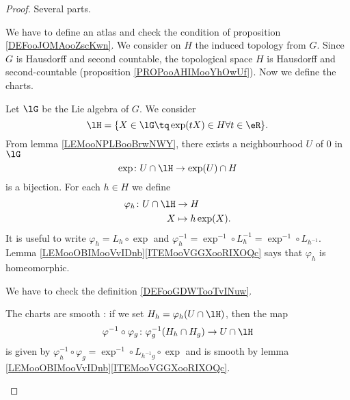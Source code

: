 \begin{proof}
	Several parts.
	\begin{subproof}

		We have to define an atlas and check the condition of proposition \ref{DEFooJOMAooZscKwn}. We consider on \( H\) the induced topology from \( G\). Since \( G\) is Hausdorff and second countable, the topological space \( H\) is Hausdorff and second-countable (proposition \ref{PROPooAHIMooYhOwUf}). Now we define the charts.

		Let \( \lG\) be the Lie algebra of \( G\). We consider
		\begin{equation}
			\lH=\{ X\in \lG\tq \exp(tX)\in H\forall t\in \eR \}.
		\end{equation}
		From lemma \ref{LEMooNPLBooBrwNWY}, there exists a neighbourhood \( U\) of \( 0\) in \( \lG\)
		\begin{equation}
			\exp \colon U\cap \lH\to \exp(U)\cap H
		\end{equation}
		is  a bijection. For each \( h\in H\) we define
		\begin{equation}
			\begin{aligned}
				\varphi_h\colon U\cap\lH & \to H             \\
				X                        & \mapsto h\exp(X).
			\end{aligned}
		\end{equation}
		It is useful to write \( \varphi_h=L_h\circ\exp\) and \( \varphi_h^{-1}=\exp^{-1}\circ L_h^{-1}=\exp^{-1}\circ L_{h^{-1}}\). Lemma \ref{LEMooOBIMooVvIDnb}\ref{ITEMooVGGXooRIXOQc} says that \( \varphi_h\) is homeomorphic.

		We have to check the definition \ref{DEFooGDWTooTvINuw}.

		\begin{subproof}
			The charts are smooth : if we set \( H_h=\varphi_h(U\cap\lH)\), then the map
			\begin{equation}
				\varphi^{-1}\circ \varphi_g \colon \varphi_g^{-1}(H_h\cap H_g)\to  	U\cap\lH
			\end{equation}
			is given by \( \varphi_h^{-1}\circ\varphi_g=\exp^{-1}\circ L_{h^{-1} g}\circ\exp\) and is smooth by lemma \ref{LEMooOBIMooVvIDnb}\ref{ITEMooVGGXooRIXOQc}.


\end{subproof}
\end{subproof}
\end{proof}
